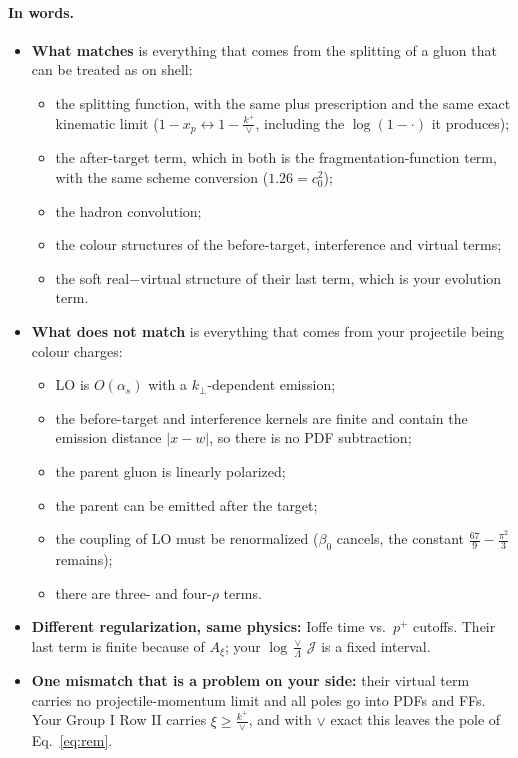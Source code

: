 \documentclass[10pt]{article}
\numberwithin{equation}{section}
\newcommand{\JJ}{\mathcal J}
\begin{document}
\paragraph{In words.}
\begin{itemize}
\item \textbf{What matches} is everything that comes from the splitting of a gluon that can be treated as on shell:
\begin{itemize}
\item the splitting function, with the same plus prescription and the same exact kinematic limit ($1-x_p\leftrightarrow1-\frac{k^+}{\vee}$, including the $\log(1-\cdot)$ it produces);
\item the after-target term, which in both is the fragmentation-function term, with the same scheme conversion ($1.26=c_0^2$);
\item the hadron convolution;
\item the colour structures of the before-target, interference and virtual terms;
\item the soft real$-$virtual structure of their last term, which is your evolution term.
\end{itemize}
\item \textbf{What does not match} is everything that comes from your projectile being colour charges:
\begin{itemize}
\item LO is $O(\alpha_s)$ with a $k_\perp$-dependent emission;
\item the before-target and interference kernels are finite and contain the emission distance $|x-w|$, so there is no PDF subtraction;
\item the parent gluon is linearly polarized;
\item the parent can be emitted after the target;
\item the coupling of LO must be renormalized ($\beta_0$ cancels, the constant $\frac{67}{9}-\frac{\pi^2}{3}$ remains);
\item there are three- and four-$\rho$ terms.
\end{itemize}
\item \textbf{Different regularization, same physics:} Ioffe time vs.\ $p^+$ cutoffs. Their last term is finite because of $A_\xi$; your $\log\frac\vee\Lambda\,\JJ$ is a fixed interval.
\item \textbf{One mismatch that is a problem on your side:} their virtual term carries no projectile-momentum limit and all poles go into PDFs and FFs. Your Group I Row II carries $\xi\ge\frac{k^+}{\vee}$, and with $\vee$ exact this leaves the pole of Eq.~\eqref{eq:rem}.
\end{itemize}
\end{document}
